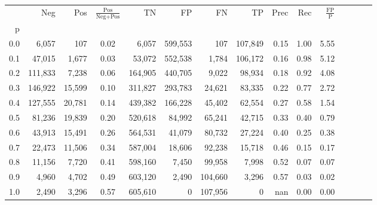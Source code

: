 \begin{tabular}{rrrcrrrrrrrrrrr}
\toprule
{} &      Neg &     Pos & $\frac{\text{Pos}}{\text{Neg}+\text{Pos}}$ &       TN &       FP &       FN &       TP &  Prec &   Rec & $\frac{\text{FP}}{\text{P}}$ \\
p   &          &         &                                            &          &          &          &          &       &       &                              \\
\midrule
0.0 &    6,057 &     107 &                                       0.02 &    6,057 &  599,553 &      107 &  107,849 &  0.15 &  1.00 &                         5.55 \\
0.1 &   47,015 &   1,677 &                                       0.03 &   53,072 &  552,538 &    1,784 &  106,172 &  0.16 &  0.98 &                         5.12 \\
0.2 &  111,833 &   7,238 &                                       0.06 &  164,905 &  440,705 &    9,022 &   98,934 &  0.18 &  0.92 &                         4.08 \\
0.3 &  146,922 &  15,599 &                                       0.10 &  311,827 &  293,783 &   24,621 &   83,335 &  0.22 &  0.77 &                         2.72 \\
0.4 &  127,555 &  20,781 &                                       0.14 &  439,382 &  166,228 &   45,402 &   62,554 &  0.27 &  0.58 &                         1.54 \\
0.5 &   81,236 &  19,839 &                                       0.20 &  520,618 &   84,992 &   65,241 &   42,715 &  0.33 &  0.40 &                         0.79 \\
0.6 &   43,913 &  15,491 &                                       0.26 &  564,531 &   41,079 &   80,732 &   27,224 &  0.40 &  0.25 &                         0.38 \\
0.7 &   22,473 &  11,506 &                                       0.34 &  587,004 &   18,606 &   92,238 &   15,718 &  0.46 &  0.15 &                         0.17 \\
0.8 &   11,156 &   7,720 &                                       0.41 &  598,160 &    7,450 &   99,958 &    7,998 &  0.52 &  0.07 &                         0.07 \\
0.9 &    4,960 &   4,702 &                                       0.49 &  603,120 &    2,490 &  104,660 &    3,296 &  0.57 &  0.03 &                         0.02 \\
1.0 &    2,490 &   3,296 &                                       0.57 &  605,610 &        0 &  107,956 &        0 &   nan &  0.00 &                         0.00 \\
\bottomrule
\end{tabular}
